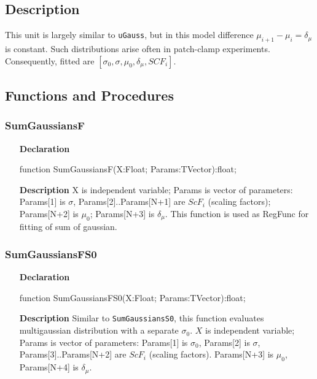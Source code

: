 \documentclass[12pt,a4paper,oneside]{report}
\newcommand{\declarationitem}[1]{\textbf{#1}}
\newcommand{\descriptiontitle}[1]{\textbf{#1}}
\newcommand{\code}[1]{\texttt{#1}}
\begin{document}
\subsection{Description}
This unit is largely similar to \code{uGauss}, but in this model difference $\mu_{i+1} - \mu_{i} = \delta_{\mu}$ is constant. Such distributions arise often in patch-clamp experiments. Consequently, fitted are $[\sigma_0,\sigma, \mu_0,\delta_{\mu},SCF_i]$.
\subsection{Functions and Procedures}
\subsubsection{SumGaussiansF}
\label{ugaussf-SumGaussiansF}
\begin{itemize}
	\item[\declarationitem{Declaration}\hfill]
	\begin{flushleft}
		\begin{ttfamily}
			function SumGaussiansF(X:Float; Params:TVector):float;
		\end{ttfamily}
	\end{flushleft}
	\item[\descriptiontitle{Description}]
	X is independent variable; Params is vector of parameters: Params[1] is $\sigma$, Params[2]..Params[N+1] are $ScF_i$ (scaling factors); Params[N+2] is $\mu_0$; Params[N+3] is $\delta_{\mu}$. This function is used as RegFunc for fitting of sum of gaussian. 
\end{itemize}
\subsubsection{SumGaussiansFS0}
\label{ugaussf-SumGaussiansFS0}
\begin{itemize}\item[\declarationitem{Declaration}\hfill]
	\begin{flushleft}
		\begin{ttfamily}
			function SumGaussiansFS0(X:Float; Params:TVector):float;
		\end{ttfamily}
	\end{flushleft}
	\item[\descriptiontitle{Description}]
	Similar to \code{SumGaussiansS0}, this function evaluates multigaussian distribution with a separate $\sigma_0$. $X$ is independent variable; Params is vector of parameters: Params[1] is $\sigma_0$, Params[2] is $\sigma$, Params[3]..Params[N+2] are $ScF_i$ (scaling factors). Params[N+3] is $\mu_0$, Params[N+4] is $\delta_{\mu}$.
\end{itemize}
\end{document}
